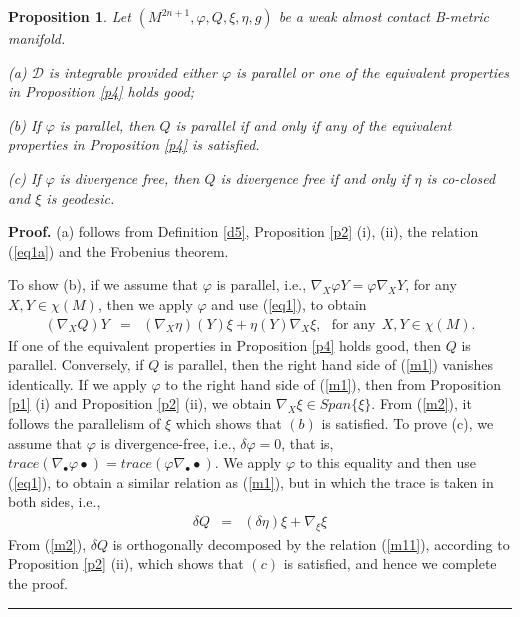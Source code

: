 \documentclass{article}
\newtheorem{proposition}[theorem]{Proposition}
\newenvironment{proof}[1][Proof]{\noindent\textbf{#1.} }{\ \rule{0.5em}{0.5em}}
\begin{document}
\begin{proposition}
	Let $(M^{2n+1},\varphi,Q,\xi,\eta,g)$ be a weak almost contact B-metric manifold.
	

\noindent (a) $\mathcal{D}$ is integrable provided either $\varphi$ is parallel or one of the equivalent properties in Proposition \ref{p4} holds good;	\medskip

\noindent (b) If $\varphi$ is parallel, then $Q$ is parallel if and only if any of the equivalent properties in Proposition \ref{p4} is satisfied. \medskip

\noindent (c) If $\varphi$ is divergence free, then $Q$ is divergence free if and only if $\eta$ is co-closed and $\xi$ is geodesic.

\end{proposition}
\begin{proof}
(a) follows from Definition \ref{d5}, Proposition \ref{p2} (i), (ii), the relation (\ref{eq1a}) and the Frobenius theorem. 


To show (b), if we assume that $\varphi$ is parallel, i.e., $\nabla_X\varphi Y= \varphi\nabla_XY$, for any $X,Y\in\chi(M)$, then we apply $\varphi$ and use (\ref{eq1}), to obtain 
\begin{eqnarray}
	(\nabla_XQ)Y&=&(\nabla_X\eta)(Y)\xi+\eta(Y)\nabla_X\xi, \ \ \ \text{for any} \ \ X,Y\in\chi(M). \label{m1}
\end{eqnarray}
If one of the equivalent properties in Proposition \ref{p4} holds good, then $Q$ is parallel. Conversely, if $Q$ is parallel, then the right hand side of (\ref{m1}) vanishes identically. If we apply $\varphi$ to the right hand side of (\ref{m1}), then from Proposition \ref{p1} (i) and Proposition \ref{p2} (ii), we obtain $\nabla_X\xi\in Span\{\xi\}$. From (\ref{m2}), it follows the parallelism of $\xi$ which shows that $(b)$ is satisfied. To prove (c), we assume that $\varphi$ is divergence-free, i.e., $\delta\varphi=0$, that is,  $trace(\nabla_{\bullet}\varphi \bullet)= trace(\varphi\nabla_{\bullet}\bullet)$. We apply $\varphi$ to this equality and then use (\ref{eq1}), to obtain a similar relation as (\ref{m1}), but in which the trace is taken in both sides, i.e.,
\begin{eqnarray}
	\delta Q&=& (\delta\eta ) \xi+\nabla_{\xi}\xi \label{m11}
\end{eqnarray}
From (\ref{m2}), $\delta Q$ is orthogonally decomposed by the relation (\ref{m11}), according to Proposition \ref{p2} (ii), which shows that $(c)$ is satisfied, and hence we complete the proof.	
\end{proof}
\end{document}
